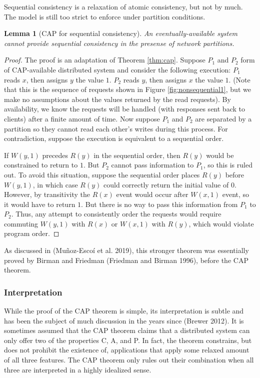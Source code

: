 \documentclass[]             %
{NASA}                       %
\newtheorem{lemma}[theorem]{Lemma}
\theoremstyle{definition}
\begin{document}
Sequential consistency is a relaxation of atomic consistency, but not by
much. The model is still too strict to enforce under partition
conditions.

\begin{lemma}[CAP for sequential consistency]
    \label{thm:cap-sequential}
    An eventually-available system cannot provide sequential consistency in the presense of network partitions.
\end{lemma}
\begin{proof}

The proof is an adaptation of Theorem \ref{thm:cap}. Suppose $P_1$ and
$P_2$ form of CAP-available distributed system and consider the
following execution: $P_1$ reads $x$, then assigns $y$ the value
$1$. $P_2$ reads $y$, then assigns $x$ the value $1$. (Note that this
is the sequence of requests shown in Figure \ref{fig:nonsequential1},
but we make no assumptions about the values returned by the read
requests). By availability, we know the requests will be handled (with
responses sent back to clients) after a finite amount of time. Now
suppose $P_1$ and $P_2$ are separated by a partition so they cannot
read each other's writes during this process. For contradiction,
suppose the execution is equivalent to a sequential order.

If $W(y,1)$ precedes $R(y)$ in the sequential order, then $R(y)$ would
be constrained to return to $1$. But $P_2$ cannot pass information to
$P_1$, so this is ruled out. To avoid this situation, suppose the
sequential order places $R(y)$ before $W(y,1)$, in which case $R(y)$
could correctly return the initial value of $0$. However, by
transitivity the $R(x)$ event would occur after $W(x,1)$ event, so it
would have to return $1$. But there is no way to pass this information
from $P_1$ to $P_2$. Thus, any attempt to consistently order the
requests would require commuting $W(y,1)$ with $R(x)$ or $W(x,1)$ with
$R(y)$, which would violate program order.
\end{proof}

As discussed in (Muñoz-Escoí et al. 2019), this stronger theorem was
essentially proved by Birman and Friedman (Friedman and Birman 1996),
before the CAP theorem.

\hypertarget{interpretation}{%
\subsubsection{Interpretation}\label{interpretation}}

While the proof of the CAP theorem is simple, its interpretation is
subtle and has been the subject of much discussion in the years since
(Brewer 2012). It is sometimes assumed that the CAP theorem claims that
a distributed system can only offer two of the properties C, A, and P.
In fact, the theorem constrains, but does not prohibit the existence of,
applications that apply some relaxed amount of all three features. The
CAP theorem only rules out their combination when all three are
interpreted in a highly idealized sense.
\end{document}
